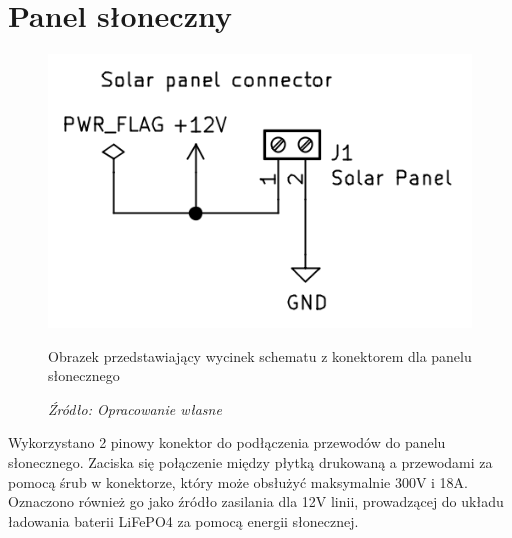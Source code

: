 \documentclass[12pt,a4paper,oneside]{memoir}
\begin{document}
\section{Panel słoneczny}
\begin{figure}[!h]
	\centering
	\includegraphics[scale=0.3]{images/sch/sch-02.png}
	{\tytulyrozdzialow \footnotesize \caption[Schemat - konektor panelu słonecznego] {Obrazek przedstawiający wycinek schematu z konektorem dla panelu słonecznego }}
	\caption*{\textit{Źródło: Opracowanie własne}}
\end{figure}
\par Wykorzystano 2 pinowy konektor do podłączenia przewodów do panelu słonecznego. Zaciska się połączenie między płytką drukowaną a przewodami za pomocą śrub w konektorze, który może obsłużyć maksymalnie 300V i 18A. Oznaczono również go jako źródło zasilania dla 12V linii, prowadzącej do układu ładowania baterii LiFePO4 za pomocą energii słonecznej.
\end{document}
